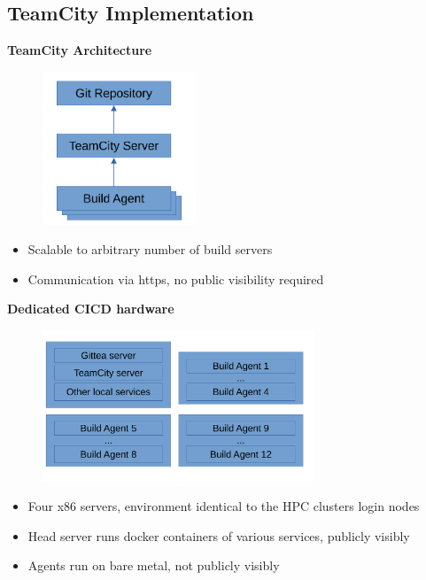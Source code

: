 \documentclass[english,xcolor=pst,11pt]{beamer}
\begin{document}
\begin{frame}

\section{TeamCity Implementation}
\textbf{TeamCity Architecture}
\begin{figure}[H]
	\centering
    {\includegraphics[width=1.8in]{diagrams/teamcity.pdf}}
\end{figure}
\vfill
\begin{itemize}
 \item Scalable to arbitrary number of build servers
 \item Communication via https, no public visibility required
\end{itemize}




\end{frame}

\begin{frame}
\textbf{Dedicated CICD hardware}
 \begin{figure}[H]
	\centering
    {\includegraphics[width=3.2in]{diagrams/hardware.pdf}}
\end{figure}

\begin{itemize}
 \item Four x86 servers, environment identical to the HPC clusters login nodes
 \item Head server runs docker containers of various services, publicly visibly
 \item Agents run on bare metal, not publicly visibly
\end{itemize}

\end{frame}
\end{document}
